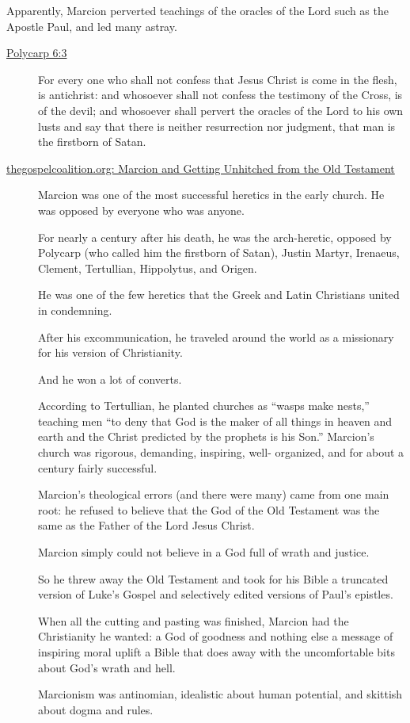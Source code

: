 \documentclass[11pt]{article}
\begin{document}
Apparently, Marcion perverted teachings of the oracles of the Lord such as the Apostle Paul, and led many astray.

\begin{description}
\item[{\href{https://www.earlychristianwritings.com/text/polycarp-lightfoot.html}{Polycarp 6:3}}] For every one who shall not confess that Jesus Christ is come in the flesh, is antichrist: and whosoever shall not confess the testimony of the Cross, is of the devil; and whosoever shall pervert the oracles of the Lord to his own lusts and say that there is neither resurrection nor judgment, that man is the firstborn of Satan.

\item[{\href{https://www.thegospelcoalition.org/blogs/kevin-deyoung/marcion-getting-unhitched-old-testament/}{thegospelcoalition.org: Marcion and Getting Unhitched from the Old Testament}}] Marcion was one of the most successful heretics in the early church.
He was opposed by everyone who was anyone.

For nearly a century after his death, he was
the arch-heretic, opposed by Polycarp (who
called him the firstborn of Satan), Justin
Martyr, Irenaeus, Clement, Tertullian,
Hippolytus, and Origen.

He was one of the few heretics that the Greek
and Latin Christians united in condemning.

After his excommunication, he traveled around
the world as a missionary for his version of
Christianity.

And he won a lot of converts.

According to Tertullian, he planted churches
as “wasps make nests,” teaching men “to deny
that God is the maker of all things in heaven
and earth and the Christ predicted by the
prophets is his Son.” Marcion’s church was
rigorous, demanding, inspiring, well-
organized, and for about a century fairly
successful.

Marcion’s theological errors (and there were
many) came from one main root: he refused to
believe that the God of the Old Testament was
the same as the Father of the Lord Jesus
Christ.

Marcion simply could not believe in a God full
of wrath and justice.

So he threw away the Old Testament and took
for his Bible a truncated version of Luke’s
Gospel and selectively edited versions of
Paul’s epistles.

When all the cutting and pasting was finished,
Marcion had the Christianity he wanted: a God
of goodness and nothing else a message of
inspiring moral uplift a Bible that does away
with the uncomfortable bits about God’s wrath
and hell.

Marcionism was antinomian, idealistic about
human potential, and skittish about dogma and
rules.
\end{description}
\end{document}
